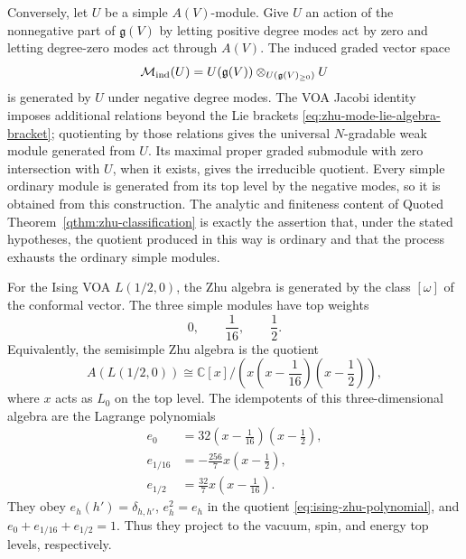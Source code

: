 Conversely, let \(U\) be a simple \(A(V)\)-module.  Give \(U\) an action of
the nonnegative part of \(\mathfrak g(V)\) by letting positive degree modes
act by zero and letting degree-zero modes act through \(A(V)\).  The induced
graded vector space
\begin{equation}
  \mathcal M_{\rm ind}(U)
  =
  U(\mathfrak g(V))\otimes_{U(\mathfrak g(V)_{\ge0})}U
  \label{eq:zhu-induced-module}
\end{equation}
is generated by \(U\) under negative degree modes.  The VOA Jacobi identity
imposes additional relations beyond the Lie brackets
\eqref{eq:zhu-mode-lie-algebra-bracket}; quotienting by those relations gives
the universal \(N\)-gradable weak module generated from \(U\).  Its maximal
proper graded submodule with zero intersection with \(U\), when it exists,
gives the irreducible quotient.  Every simple ordinary module is generated
from its top level by the negative modes, so it is obtained from this
construction.  The analytic and finiteness content of Quoted
Theorem~\ref{qthm:zhu-classification} is exactly the assertion that, under
the stated hypotheses, the quotient produced in this way is ordinary and that
the process exhausts the ordinary simple modules.

\begin{example}
\label{ex:ising-zhu-algebra-top-weights}
For the Ising VOA \(L(1/2,0)\), the Zhu algebra is generated by the class
\([\omega]\) of the conformal vector.  The three simple modules have top
weights
\[
  0,\qquad \frac1{16},\qquad \frac12 .
\]
Equivalently, the semisimple Zhu algebra is the quotient
\begin{equation}
  A(L(1/2,0))
  \cong
  \mathbb C[x]\Big/
  \left(x\left(x-\frac1{16}\right)\left(x-\frac12\right)\right),
  \label{eq:ising-zhu-polynomial}
\end{equation}
where \(x\) acts as \(L_0\) on the top level.  The idempotents of this
three-dimensional algebra are the Lagrange polynomials
\begin{align}
  e_0
  &=
  32\left(x-\frac1{16}\right)\left(x-\frac12\right),
  \\
  e_{1/16}
  &=
  -\frac{256}{7}x\left(x-\frac12\right),
  \\
  e_{1/2}
  &=
  \frac{32}{7}x\left(x-\frac1{16}\right).
  \label{eq:ising-zhu-idempotents}
\end{align}
They obey \(e_h(h')=\delta_{h,h'}\), \(e_h^2=e_h\) in the quotient
\eqref{eq:ising-zhu-polynomial}, and \(e_0+e_{1/16}+e_{1/2}=1\).  Thus they
project to the vacuum, spin, and energy top levels, respectively.
\end{example}

